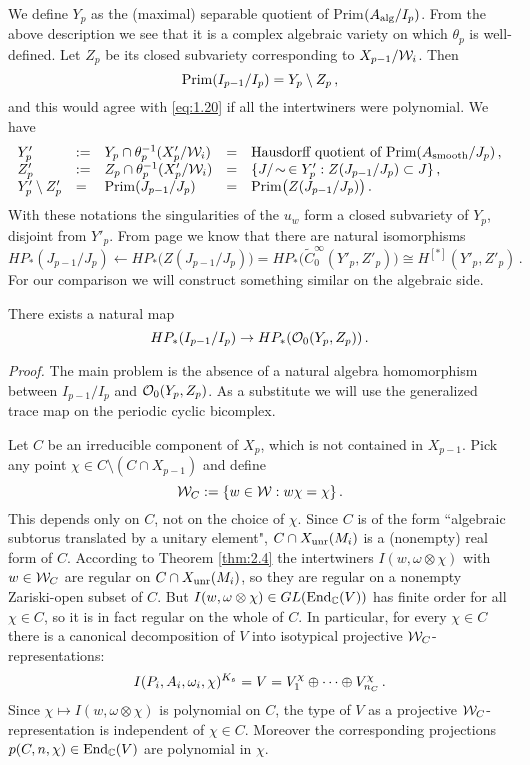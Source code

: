 We define $Y_p$ as the (maximal) separable quotient of Prim$ (A_\mathrm{alg} / I_p )$. From the above 
description we see that it is a complex algebraic variety on which $\theta_p$ is well-defined. 
Let $Z_p$ be its closed subvariety corresponding to $X_{p-1} / \mathcal W_i$. Then
\[
\mathrm{Prim}(I_{p-1} /I_p ) = Y_p \setminus Z_p \,,
\]
and this would agree with \eqref{eq:1.20} if all the intertwiners were polynomial. We have
\[
\begin{array}{lllll}
Y'_p & := & Y_p \cap \theta_p^{-1} (X'_p / \mathcal W_i ) & = & 
\text{Hausdorff quotient of Prim} (A_\mathrm{smooth} / J_p ) \,, \\
Z'_p & := & Z_p \cap \theta_p^{-1} (X'_p / \mathcal W_i ) & = & 
\{ J/ \! \sim \, \in Y'_p : Z(J_{p-1} / J_p ) \subset J \} \,, \\
Y'_p \setminus Z'_p & = & \mathrm{Prim}(J_{p-1} /J_p ) & = & \mathrm{Prim} \big( Z(J_{p-1} /J_p ) \big) \,.
\end{array}
\]
With these notations the singularities of the $u_w$ form a closed subvariety of $Y_p$, 
disjoint from $Y'_p$. From page \pageref{eq:1.21} we know that there are natural isomorphisms
\begin{equation}
HP_* (J_{p-1} / J_p ) \leftarrow HP_* \big( Z(J_{p-1} / J_p ) \big) =
HP_* \big( \tilde C_0^\infty (Y'_p ,Z'_p) \big) \cong H^{[*]} (Y'_p ,Z'_p ) \,.
\end{equation}
For our comparison we will construct something similar on the algebraic side.

\begin{lem}\label{lem:3.9}
There exists a natural map
\[
HP_* (I_{p-1} /I_p ) \to HP_* (\mathcal O_0 (Y_p ,Z_p )) \,. 
\]
\end{lem}
\emph{Proof.}
The main problem is the absence of a natural algebra homomorphism between $I_{p-1} / I_p$ and 
$\mathcal O_0 (Y_p ,Z_p)$. As a substitute we will use the generalized
trace map on the periodic cyclic bicomplex.

Let $C$ be an irreducible component of $X_p$, which is not contained in $X_{p-1}$. Pick
any point $\chi \in C \setminus (C \cap X_{p-1})$ and define
\[
\mathcal W_C := \{ w \in \mathcal W : w \chi = \chi \} \,.
\]
This depends only on $C$, not on the choice of $\chi$. Since $C$ is of the form ``algebraic
subtorus translated by a unitary element", $C \cap X_{\mathrm{unr}} (M_i )$ is a (nonempty) real form 
of $C$. According to Theorem \ref{thm:2.4} the intertwiners $I (w,\omega \otimes \chi )$ with 
$w \in \mathcal W_C$ are regular on $C \cap X_{\mathrm{unr}} (M_i )$, so they are regular on a nonempty 
Zariski-open subset of $C$. But $I(w ,\omega \otimes \chi ) \in GL ( \mathrm{End}_{\mathbb C}(V))$ 
has finite order for all $\chi \in C$, so it is in fact regular on the whole of $C$. In particular, 
for every $\chi \in C$ there is a canonical decomposition of $V$ into isotypical projective 
$\mathcal W_C$-representations:
\begin{equation}\label{eq:3.6}
I(P_i ,A_i ,\omega_i ,\chi )^{K_{\mathfrak s}} = V = V_1^\chi \oplus \cdots \oplus V_{n_C}^\chi \,.
\end{equation}
Since $\chi \mapsto I(w,\omega \otimes \chi)$ is polynomial on $C$, the type of $V$ as a 
projective $\mathcal W_C$-representation is independent of $\chi \in C$. Moreover the corresponding 
projections $p(C,n,\chi) \in \mathrm{End}_{\mathbb C} (V)$ are polynomial in $\chi$.

